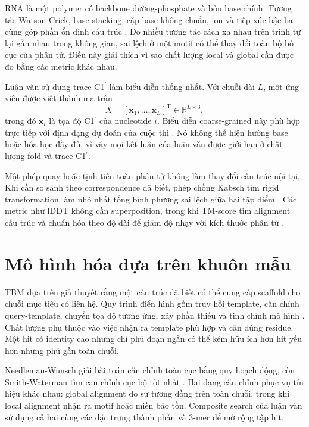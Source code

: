 \documentclass[12pt,a4paper,oneside]{report}
\newcommand{\cprime}{C1$^{\prime}$}
\newcommand{\T}{\mathrm{T}}
\begin{document}
RNA là một polymer có backbone đường-phosphate và bốn base chính. Tương tác Watson-Crick,
base stacking, cặp base không chuẩn, ion và tiếp xúc bậc ba cùng góp phần ổn định cấu
trúc \cite{tinoco_folding,butcher_tertiary}. Do nhiều tương tác cách xa nhau trên trình
tự lại gần nhau trong không gian, sai lệch ở một motif có thể thay đổi toàn bộ bố cục
của phân tử. Điều này giải thích vì sao chất lượng local và global cần được đo bằng các
metric khác nhau.

Luận văn sử dụng trace \cprime{} làm biểu diễn thống nhất. Với chuỗi dài $L$, một ứng
viên được viết thành ma trận
\begin{equation}
X = [\mathbf{x}_1,\ldots,\mathbf{x}_L]^\T \in \mathbb{R}^{L\times 3},
\end{equation}
trong đó $\mathbf{x}_i$ là tọa độ \cprime{} của nucleotide $i$. Biểu diễn coarse-grained
này phù hợp trực tiếp với định dạng dự đoán của cuộc thi
\cite{competition_paper,kaggle_competition}. Nó không thể hiện hướng base hoặc hóa học
đầy đủ, vì vậy mọi kết luận của luận văn được giới hạn ở chất lượng fold và trace
\cprime{}.

Một phép quay hoặc tịnh tiến toàn phân tử không làm thay đổi cấu trúc nội tại. Khi cần
so sánh theo correspondence đã biết, phép chồng Kabsch tìm rigid transformation làm
nhỏ nhất tổng bình phương sai lệch giữa hai tập điểm \cite{kabsch}. Các metric như
lDDT không cần superposition, trong khi TM-score tìm alignment cấu trúc và chuẩn hóa
theo độ dài để giảm độ nhạy với kích thước phân tử \cite{tm_score,lddt,usalign}.

\section{Mô hình hóa dựa trên khuôn mẫu}

TBM dựa trên giả thuyết rằng một cấu trúc đã biết có thể cung cấp scaffold cho chuỗi
mục tiêu có liên hệ. Quy trình điển hình gồm truy hồi template, căn chỉnh query-template,
chuyển tọa độ tương ứng, xây phần thiếu và tinh chỉnh mô hình
\cite{rna_progress_review,competition_paper}. Chất lượng phụ thuộc vào việc nhận ra
template phù hợp và căn đúng residue. Một hit có identity cao nhưng chỉ phủ đoạn ngắn
có thể kém hữu ích hơn hit yếu hơn nhưng phủ gần toàn chuỗi.

Needleman-Wunsch giải bài toán căn chỉnh toàn cục bằng quy hoạch động, còn
Smith-Waterman tìm căn chỉnh cục bộ tốt nhất \cite{needleman_wunsch,smith_waterman}.
Hai dạng căn chỉnh phục vụ tín hiệu khác nhau: global alignment đo sự tương đồng trên
toàn chuỗi, trong khi local alignment nhận ra motif hoặc miền bảo tồn. Composite search
của luận văn sử dụng cả hai cùng các đặc trưng thành phần và 3-mer để mở rộng tập hit.
\end{document}
